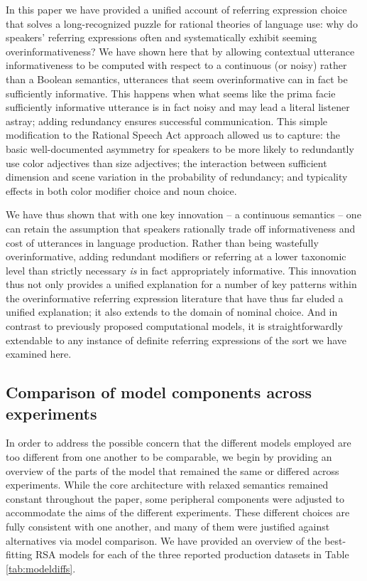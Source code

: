 \documentclass[11pt]{article}
\newcommand{\tableref}[1]{Table \ref{#1}}
\begin{document}
In this paper we have provided a unified account of referring expression choice that solves a long-recognized puzzle for rational theories of language use: why do speakers'  referring expressions often and systematically exhibit seeming overinformativeness? We have shown here that by allowing contextual utterance informativeness to be computed with respect to a continuous (or noisy) rather than a Boolean semantics, utterances that seem overinformative can in fact be sufficiently informative. This happens when what seems like the prima facie sufficiently informative utterance is in fact noisy and may lead a literal listener astray; adding redundancy ensures successful communication. This simple modification to the Rational Speech Act approach allowed us to capture: the basic well-documented asymmetry for speakers to be more likely to redundantly use color adjectives than size adjectives; the interaction between sufficient dimension and scene variation in the probability of redundancy; and typicality effects in both color modifier choice and noun choice. 

We have thus shown that with one key innovation -- a continuous semantics  -- one can retain the assumption that speakers rationally trade off informativeness and cost of utterances in language production. Rather than being wastefully overinformative, adding redundant modifiers or referring at a lower taxonomic level than strictly necessary \emph{is} in fact appropriately informative.
This innovation thus not only provides a unified explanation for a number of key patterns within the overinformative referring expression literature that have thus far eluded a unified explanation; it also extends to the domain of nominal choice. And in contrast to previously proposed computational models, it is straightforwardly extendable to any instance of definite referring expressions of the sort we have examined here. 

\subsection{Comparison of model components across experiments}

In order to address the possible concern that the different models employed are too different from one another to be comparable, we begin by providing an overview of the parts of the model that remained the same or differed across experiments. While the core architecture with relaxed semantics remained constant throughout the paper, some peripheral components were adjusted to accommodate the aims of the different experiments. 
These different choices are fully consistent with one another, and many of them were justified against alternatives via model comparison.
We have provided an overview of the best-fitting RSA models for each of the three reported production datasets in \tableref{tab:modeldiffs}. 
\end{document}
